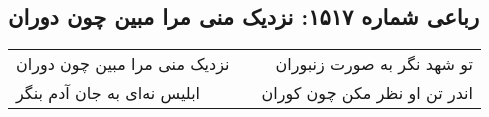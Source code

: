 \begin{center}
\section*{رباعی شماره ۱۵۱۷: نزدیک منی مرا مبین چون دوران}
\label{sec:1517}
\begin{longtable}{l p{0.5cm} r}
نزدیک منی مرا مبین چون دوران
&&
تو شهد نگر به صورت زنبوران
\\
ابلیس نه‌ای به جان آدم بنگر
&&
اندر تن او نظر مکن چون کوران
\\
\end{longtable}
\end{center}
